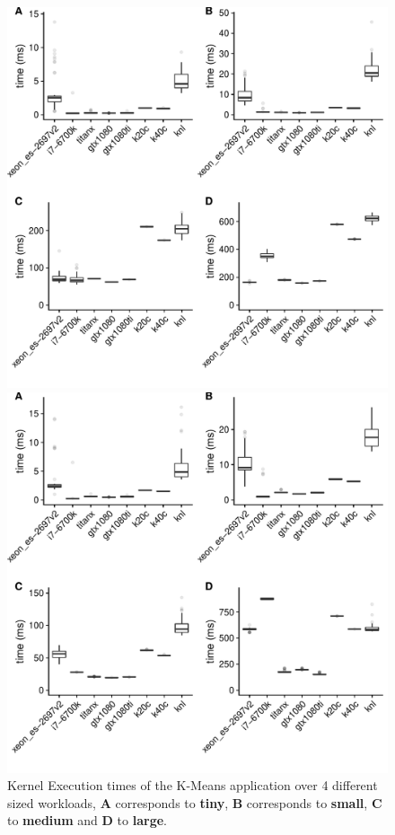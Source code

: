 \documentclass[../document.tex]{subfiles}
\begin{document}
\label{ssec:time}

\begin{figure}[ht]
\begin{minipage}[b]{.45\textwidth}
\centering
\includegraphics[width=1\textwidth]{figures/time-results/kmeans.pdf}
\caption{Kernel Execution times of the K-Means application over 4 different sized workloads, {\bf A} corresponds to {\bf tiny}, {\bf B} corresponds to {\bf small}, {\bf C} to {\bf medium} and {\bf D} to {\bf large}.}
\label{fig:time-kmeans}
\end{minipage}
\hfill
\begin{minipage}[b]{.45\textwidth}
\centering
\includegraphics[width=1\textwidth]{figures/time-results/lud.pdf}

\end{minipage}
\end{figure}
\end{document}
